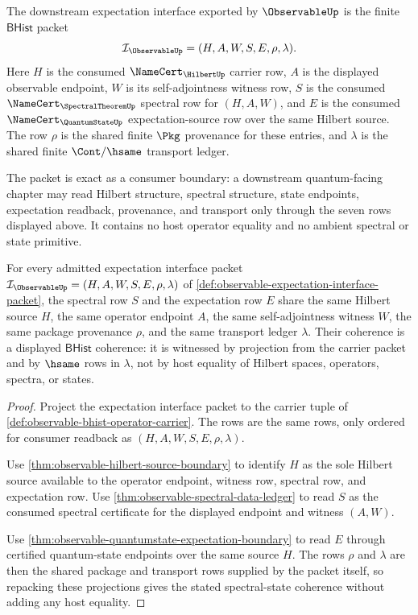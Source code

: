 \begin{definition}
\label{def:observable-expectation-interface-packet}
The downstream expectation interface exported by $\ObservableUp$ is the
finite $\mathsf{BHist}$ packet
$$
\mathcal{I}_{\ObservableUp}=(H,A,W,S,E,\rho,\lambda).
$$
Here $H$ is the consumed $\NameCert_{\HilbertUp}$ carrier row, $A$ is the
displayed observable endpoint, $W$ is its self-adjointness witness row, $S$
is the consumed $\NameCert_{\SpectralTheoremUp}$ spectral row for $(H,A,W)$,
and $E$ is the consumed $\NameCert_{\QuantumStateUp}$ expectation-source row
over the same Hilbert source. The row $\rho$ is the shared finite $\Pkg$
provenance for these entries, and $\lambda$ is the shared finite
$\Cont/\hsame$ transport ledger.

The packet is exact as a consumer boundary: a downstream quantum-facing
chapter may read Hilbert structure, spectral structure, state endpoints,
expectation readback, provenance, and transport only through the seven rows
displayed above. It contains no host operator equality and no ambient
spectral or state primitive.
\end{definition}

\begin{theorem}
\label{thm:observable-spectral-state-source-coherence}
For every admitted expectation interface packet
$\mathcal{I}_{\ObservableUp}=(H,A,W,S,E,\rho,\lambda)$ of
\autoref{def:observable-expectation-interface-packet}, the spectral row $S$
and the expectation row $E$ share the same Hilbert source $H$, the same
operator endpoint $A$, the same self-adjointness witness $W$, the same
package provenance $\rho$, and the same transport ledger $\lambda$. Their
coherence is a displayed $\mathsf{BHist}$ coherence: it is witnessed by
projection from the carrier packet and by $\hsame$ rows in $\lambda$, not by
host equality of Hilbert spaces, operators, spectra, or states.
\end{theorem}
\begin{proof}
Project the expectation interface packet to the carrier tuple of
\autoref{def:observable-bhist-operator-carrier}. The rows are the same rows,
only ordered for consumer readback as $(H,A,W,S,E,\rho,\lambda)$.

Use \autoref{thm:observable-hilbert-source-boundary} to identify $H$ as the
sole Hilbert source available to the operator endpoint, witness row, spectral
row, and expectation row. Use
\autoref{thm:observable-spectral-data-ledger} to read $S$ as the consumed
spectral certificate for the displayed endpoint and witness $(A,W)$.

Use \autoref{thm:observable-quantumstate-expectation-boundary} to read $E$
through certified quantum-state endpoints over the same source $H$. The rows
$\rho$ and $\lambda$ are then the shared package and transport rows supplied
by the packet itself, so repacking these projections gives the stated
spectral-state coherence without adding any host equality.
\end{proof}

